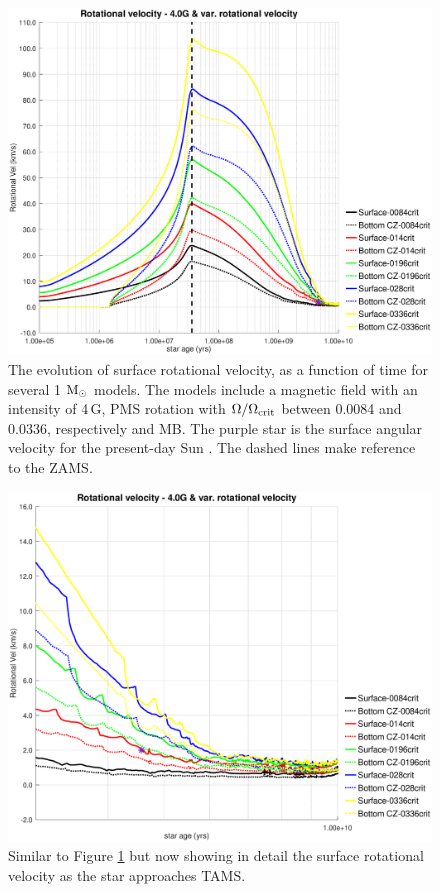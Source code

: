 \documentclass[fleqn,usenatbib]{mnras}
\begin{document}
\begin{figure}
	\includegraphics[trim = 30mm 15mm 20mm 15mm, clip,width=\columnwidth]{figures/rot_vel_var_vel_4_0g.eps}
    \caption{The evolution of surface rotational velocity, as a function of time for several 1 $\mathrm{M}_\odot$ models. The models include a magnetic field with an intensity of 4\,G, PMS rotation with $\Omega / \Omega_{\mathrm{crit}}$ between 0.0084 and 0.0336, respectively and MB. The purple star is the surface angular velocity for the present-day Sun \citep{Gill2012}. The dashed lines make reference to the ZAMS.}
    \label{fig:rot_vel_4g}
\end{figure}

\begin{figure}
	\includegraphics[trim = 30mm 15mm 20mm 15mm, clip,width=\columnwidth]{figures/rot_vel_var_vel_4_0g_z1.eps}
    \caption{Similar to Figure \ref{fig:rot_vel_4g} but now showing in detail the surface rotational velocity as the star approaches TAMS.}
    \label{fig:rot_vel_4g_z1}
\end{figure}
\end{document}

